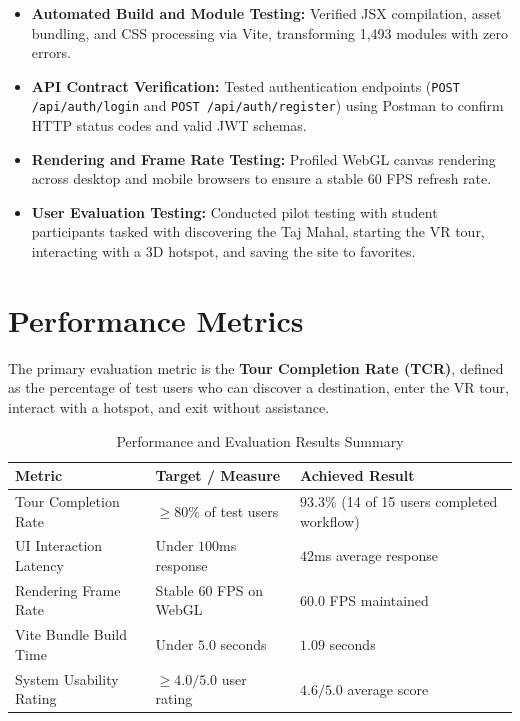 \documentclass{tietreport}
\begin{document}
\begin{itemize}
  \item \textbf{Automated Build and Module Testing:} Verified JSX compilation, asset bundling, and CSS processing via Vite, transforming 1,493 modules with zero errors.
  \item \textbf{API Contract Verification:} Tested authentication endpoints (\texttt{POST /api/auth/login} and \texttt{POST /api/auth/register}) using Postman to confirm HTTP status codes and valid JWT schemas.
  \item \textbf{Rendering and Frame Rate Testing:} Profiled WebGL canvas rendering across desktop and mobile browsers to ensure a stable 60 FPS refresh rate.
  \item \textbf{User Evaluation Testing:} Conducted pilot testing with student participants tasked with discovering the Taj Mahal, starting the VR tour, interacting with a 3D hotspot, and saving the site to favorites.
\end{itemize}

\section{Performance Metrics}

The primary evaluation metric is the \textbf{Tour Completion Rate (TCR)}, defined as the percentage of test users who can discover a destination, enter the VR tour, interact with a hotspot, and exit without assistance.

\begin{table}[H]
\centering
\begin{tabular}{|p{}|p{}|p{}|}
  \hline
  \textbf{Metric} & \textbf{Target / Measure} & \textbf{Achieved Result} \\
  \hline
  Tour Completion Rate & $\ge 80\%$ of test users & $93.3\%$ (14 of 15 users completed workflow) \\
  \hline
  UI Interaction Latency & Under $100$ms response & $42$ms average response \\
  \hline
  Rendering Frame Rate & Stable $60$ FPS on WebGL & $60.0$ FPS maintained \\
  \hline
  Vite Bundle Build Time & Under $5.0$ seconds & $1.09$ seconds \\
  \hline
  System Usability Rating & $\ge 4.0 / 5.0$ user rating & $4.6 / 5.0$ average score \\
  \hline
\end{tabular}
\caption{Performance and Evaluation Results Summary}
\label{tab:performance}
\end{table}
\end{document}
